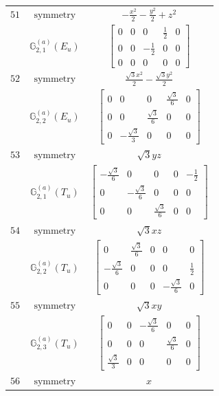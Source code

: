 \documentclass[fleqn,8pt,landscape]{jsarticle}
\begin{document}
\begin{longtable}{ccc}
$ 51 $ & $ \text{symmetry} $ & $ - \frac{x^{2}}{2} - \frac{y^{2}}{2} + z^{2} $ \\
$  $ & $ \mathbb{G}_{2,1}^{(a)}(E_{u}) $ & $ \begin{bmatrix} 0 & 0 & 0 & \frac{1}{2} & 0 \\ 0 & 0 & - \frac{1}{2} & 0 & 0 \\ 0 & 0 & 0 & 0 & 0 \end{bmatrix} $ \\ \hline
$ 52 $ & $ \text{symmetry} $ & $ \frac{\sqrt{3} x^{2}}{2} - \frac{\sqrt{3} y^{2}}{2} $ \\
$  $ & $ \mathbb{G}_{2,2}^{(a)}(E_{u}) $ & $ \begin{bmatrix} 0 & 0 & 0 & \frac{\sqrt{3}}{6} & 0 \\ 0 & 0 & \frac{\sqrt{3}}{6} & 0 & 0 \\ 0 & - \frac{\sqrt{3}}{3} & 0 & 0 & 0 \end{bmatrix} $ \\ \hline
$ 53 $ & $ \text{symmetry} $ & $ \sqrt{3} y z $ \\
$  $ & $ \mathbb{G}_{2,1}^{(a)}(T_{u}) $ & $ \begin{bmatrix} - \frac{\sqrt{3}}{6} & 0 & 0 & 0 & - \frac{1}{2} \\ 0 & - \frac{\sqrt{3}}{6} & 0 & 0 & 0 \\ 0 & 0 & \frac{\sqrt{3}}{6} & 0 & 0 \end{bmatrix} $ \\ \hline
$ 54 $ & $ \text{symmetry} $ & $ \sqrt{3} x z $ \\
$  $ & $ \mathbb{G}_{2,2}^{(a)}(T_{u}) $ & $ \begin{bmatrix} 0 & \frac{\sqrt{3}}{6} & 0 & 0 & 0 \\ - \frac{\sqrt{3}}{6} & 0 & 0 & 0 & \frac{1}{2} \\ 0 & 0 & 0 & - \frac{\sqrt{3}}{6} & 0 \end{bmatrix} $ \\ \hline
$ 55 $ & $ \text{symmetry} $ & $ \sqrt{3} x y $ \\
$  $ & $ \mathbb{G}_{2,3}^{(a)}(T_{u}) $ & $ \begin{bmatrix} 0 & 0 & - \frac{\sqrt{3}}{6} & 0 & 0 \\ 0 & 0 & 0 & \frac{\sqrt{3}}{6} & 0 \\ \frac{\sqrt{3}}{3} & 0 & 0 & 0 & 0 \end{bmatrix} $ \\ \hline
$ 56 $ & $ \text{symmetry} $ & $ x $ \\

\end{longtable}
\end{document}
